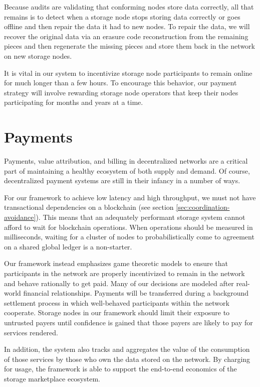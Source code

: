\documentclass[8pt,fleqn,openany]{book}
\begin{document}
Because audits are validating that conforming nodes store data correctly, all
that remains is to detect when a storage node stops storing
data correctly or goes offline and then repair the data it had to new nodes.
To repair the data, we will recover the original data via an erasure code
reconstruction from the remaining pieces and then regenerate the missing
pieces and store them back in the network on new storage nodes.

It is vital in our system to incentivize storage node participants to remain
online for much longer than a few hours. To encourage this behavior,
our payment strategy will involve rewarding storage node
operators that keep their nodes participating for months and years at a time.

\section{Payments}

Payments, value attribution, and billing in decentralized networks are a
critical part of maintaining a healthy
ecosystem of both supply and demand. Of course, decentralized payment systems
are still in their infancy in a number of ways.

For our framework to achieve low latency and high throughput, we must not have
transactional dependencies on a blockchain (see section \ref{sec:coordination-avoidance}).
This means that an adequately performant storage system cannot afford to
wait for blockchain operations. When operations should be measured in
milliseconds, waiting for a cluster of nodes to probabilistically come to
agreement on a shared global ledger is a non-starter.

Our framework instead emphasizes game theoretic models to ensure
that participants in the network are properly incentivized to remain in the
network and behave rationally to get paid.
Many of our decisions are modeled after real-world financial relationships.
Payments will be transferred during
a background settlement process in which well-behaved participants within
the network cooperate. Storage nodes in our framework should limit their exposure
to untrusted payers until confidence is gained that those payers are likely
to pay for services rendered.

In addition, the system also tracks and aggregates the value of the
consumption of those services by those who own the data stored on the network.
By charging for usage, the framework is able to support the end-to-end
economics of the storage marketplace ecosystem.
\end{document}
